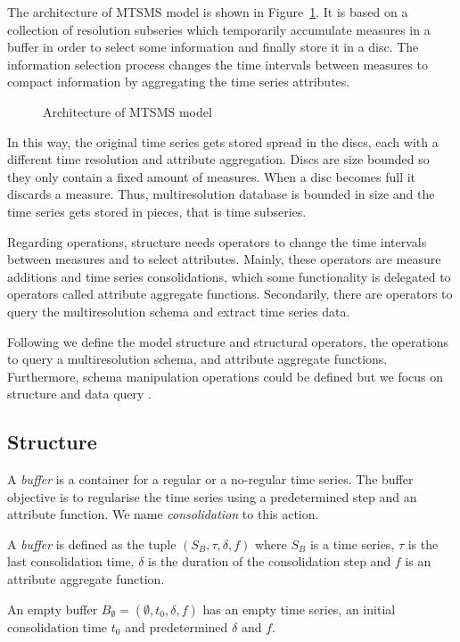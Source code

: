 The architecture of MTSMS model is shown in
Figure~\ref{fig:model:mtsdb}.  It is based on a collection of
resolution subseries which temporarily accumulate measures in a buffer
in order to select some information and finally store it in a
disc. The information selection process changes the time intervals
between measures to compact information by aggregating the time series
attributes.

\begin{figure}
  \centering
  
  \caption{Architecture of MTSMS model}
  \label{fig:model:mtsdb}
\end{figure}


In this way, the original time series gets stored spread in the discs,
each with a different time resolution and attribute aggregation.
Discs are size bounded so they only contain a fixed amount of
measures. When a disc becomes full it discards a measure. Thus,
multiresolution database is bounded in size and the time series gets
stored in pieces, that is time subseries.

Regarding operations,  structure needs operators to change
the time intervals between measures and to select attributes. Mainly,
these operators are measure additions and time series consolidations,
which some functionality is delegated to operators called attribute
aggregate functions. Secondarily, there are operators to query the
multiresolution schema and extract time series data.


Following we define the  model structure and structural
operators, the operations to query a multiresolution schema, and
attribute aggregate functions.  Furthermore, schema manipulation
operations could be defined but we focus on structure and data query .


\subsection{Structure}

A \emph{buffer} is a container for a regular or a no-regular time
series. The buffer objective is to regularise the time series using a
predetermined step and an attribute function. We name
\emph{consolidation} to this action.
\begin{definition}%
  A \emph{buffer} is defined as the tuple $(S_B,\tau,\delta,f)$ where
  $S_B$ is a time series, $\tau$ is the last consolidation time,
  $\delta$ is the duration of the consolidation step and $f$ is an
  attribute aggregate function.

  An empty buffer $B_{\emptyset} = (\emptyset,t_0, \delta, f)$ has an
  empty time series, an initial consolidation time $t_0$ and
  predetermined $\delta$ and $f$.
\end{definition}

